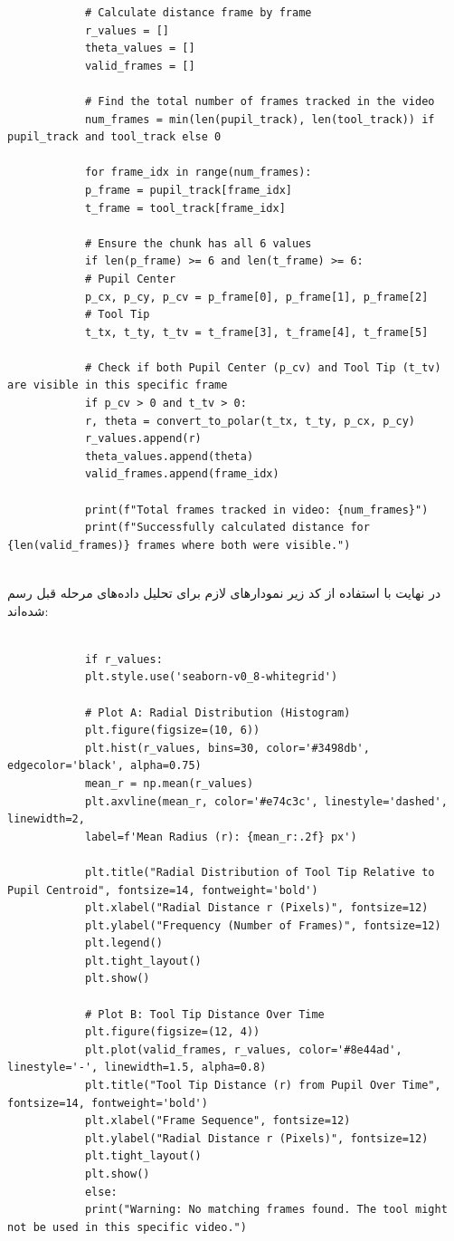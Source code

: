 \documentclass{article}
\begin{document}
\begin{latin}
\begin{LTR}
\begin{verbatim}
			# Calculate distance frame by frame
			r_values = []
			theta_values = []
			valid_frames = []
			
			# Find the total number of frames tracked in the video
			num_frames = min(len(pupil_track), len(tool_track)) if pupil_track and tool_track else 0
			
			for frame_idx in range(num_frames):
			p_frame = pupil_track[frame_idx]
			t_frame = tool_track[frame_idx]
			
			# Ensure the chunk has all 6 values
			if len(p_frame) >= 6 and len(t_frame) >= 6:
			# Pupil Center
			p_cx, p_cy, p_cv = p_frame[0], p_frame[1], p_frame[2]
			# Tool Tip
			t_tx, t_ty, t_tv = t_frame[3], t_frame[4], t_frame[5]
			
			# Check if both Pupil Center (p_cv) and Tool Tip (t_tv) are visible in this specific frame
			if p_cv > 0 and t_tv > 0:
			r, theta = convert_to_polar(t_tx, t_ty, p_cx, p_cy)
			r_values.append(r)
			theta_values.append(theta)
			valid_frames.append(frame_idx)
			
			print(f"Total frames tracked in video: {num_frames}")
			print(f"Successfully calculated distance for {len(valid_frames)} frames where both were visible.")
			
		\end{verbatim}
	\end{LTR}
\end{latin}

در نهایت با استفاده از کد زیر نمودارهای لازم برای تحلیل داده‌های مرحله قبل رسم شده‌اند:
\begin{latin}
	\begin{LTR}
		\begin{verbatim}
			
			if r_values:
			plt.style.use('seaborn-v0_8-whitegrid')
			
			# Plot A: Radial Distribution (Histogram)
			plt.figure(figsize=(10, 6))
			plt.hist(r_values, bins=30, color='#3498db', edgecolor='black', alpha=0.75)
			mean_r = np.mean(r_values)
			plt.axvline(mean_r, color='#e74c3c', linestyle='dashed', linewidth=2,
			label=f'Mean Radius (r): {mean_r:.2f} px')
			
			plt.title("Radial Distribution of Tool Tip Relative to Pupil Centroid", fontsize=14, fontweight='bold')
			plt.xlabel("Radial Distance r (Pixels)", fontsize=12)
			plt.ylabel("Frequency (Number of Frames)", fontsize=12)
			plt.legend()
			plt.tight_layout()
			plt.show()
			
			# Plot B: Tool Tip Distance Over Time
			plt.figure(figsize=(12, 4))
			plt.plot(valid_frames, r_values, color='#8e44ad', linestyle='-', linewidth=1.5, alpha=0.8)
			plt.title("Tool Tip Distance (r) from Pupil Over Time", fontsize=14, fontweight='bold')
			plt.xlabel("Frame Sequence", fontsize=12)
			plt.ylabel("Radial Distance r (Pixels)", fontsize=12)
			plt.tight_layout()
			plt.show()
			else:
			print("Warning: No matching frames found. The tool might not be used in this specific video.")
		\end{verbatim}
	\end{LTR}
\end{latin}
\end{document}
